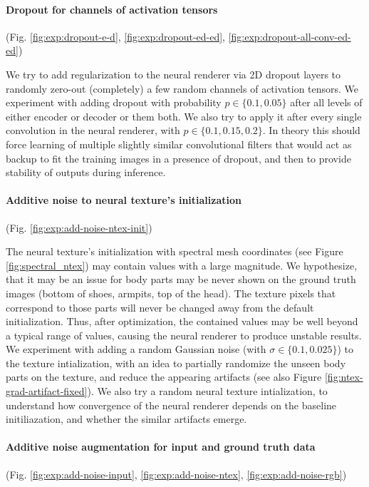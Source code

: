 \vspace{-15pt}\paragraph{Dropout for channels of activation tensors}(Fig. \ref{fig:exp:dropout-e-d}, \ref{fig:exp:dropout-ed-ed}, \ref{fig:exp:dropout-all-conv-ed-ed})\mbox{}\nopagebreak

We try to add regularization to the neural renderer via 2D dropout layers \cite{aux:dropout2d-15} to randomly zero-out (completely) a few random channels of activation tensors. We experiment with adding dropout with probability $p \in \{0.1, 0.05\}$ after all levels of either encoder or decoder or them both. We also try to apply it after every single convolution in the neural renderer, with $p \in \{0.1, 0.15, 0.2\}$. In theory this should force learning of multiple slightly similar convolutional filters that would act as backup to fit the training images in a presence of dropout, and then to provide stability of outputs during inference.

\vspace{-15pt}\paragraph{Additive noise to neural texture's initialization}(Fig. \ref{fig:exp:add-noise-ntex-init})\mbox{}\nopagebreak

The neural texture's initialization with spectral mesh coordinates (see Figure \ref{fig:spectral_ntex}) may contain values with a large magnitude. We hypothesize, that it may be an issue for body parts may be never shown on the ground truth images (bottom of shoes, armpits, top of the head). The texture pixels that correspond to those parts will never be changed away from the default initialization. Thus, after optimization, the contained values may be well beyond a typical range of values, causing the neural renderer to produce unstable results. We experiment with adding a random Gaussian noise (with $\sigma\in\{0.1, 0.025\}$) to the texture intialization, with an idea to partially randomize the unseen body parts on the texture, and reduce the appearing artifacts (see also Figure \ref{fig:ntex-grad-artifact-fixed}). We also try a random neural texture intialization, to understand how convergence of the neural renderer depends on the baseline initiliazation, and whether the similar artifacts emerge.

\vspace{-15pt}\paragraph{Additive noise augmentation for input and ground truth data}(Fig. \ref{fig:exp:add-noise-input}, \ref{fig:exp:add-noise-ntex}, \ref{fig:exp:add-noise-rgb})\mbox{}\nopagebreak

